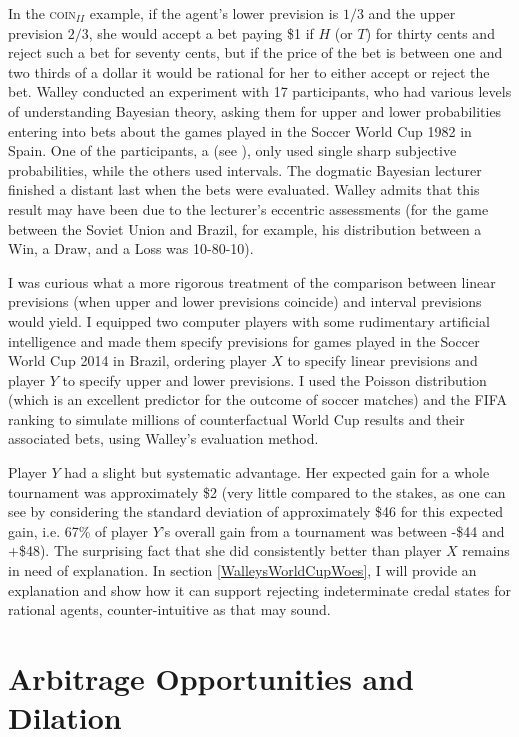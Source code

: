 In the \textsc{coin}$_{II}$ example, if the agent's
lower prevision is $1/3$ and the upper prevision $2/3$,
she would accept a bet paying \$1 if $H$ (or $T$) for
thirty cents and reject such a bet for seventy cents,
but if the price of the bet is between one and two
thirds of a dollar it would be rational for her to
either accept or reject the bet. Walley conducted an
experiment with 17 participants, who had various levels
of understanding Bayesian theory, asking them for upper
and lower probabilities entering into bets about the
games played in the Soccer World Cup 1982 in Spain. One
of the participants, a  (see ), only used
single sharp subjective probabilities, while the others
used intervals. The dogmatic Bayesian lecturer finished
a distant last when the bets were evaluated. Walley
admits that this result may have been due to the
lecturer's eccentric assessments (for the game between
the Soviet Union and Brazil, for example, his
distribution between a Win, a Draw, and a Loss was
10-80-10).

I was curious what a more rigorous treatment of the
comparison between linear previsions (when upper and
lower previsions coincide) and interval previsions
would yield. I equipped two computer players with some
rudimentary artificial intelligence and made them
specify previsions for games played in the Soccer World
Cup 2014 in Brazil, ordering player $X$ to specify
linear previsions and player $Y$ to specify upper and
lower previsions. I used the Poisson distribution
(which is an excellent predictor for the outcome of
soccer matches) and the FIFA ranking to simulate
millions of counterfactual World Cup results and their
associated bets, using Walley's evaluation method.

Player $Y$ had a slight but systematic advantage. Her
expected gain for a whole tournament was approximately
\$2 (very little compared to the stakes, as one can see
by considering the standard deviation of approximately
\$46 for this expected gain, i.e. 67\% of player $Y$'s
overall gain from a tournament was between -\$44 and
+\$48). The surprising fact that she did consistently
better than player $X$ remains in need of explanation.
In section \ref{WalleysWorldCupWoes}, I will provide an
explanation and show how it can support rejecting
indeterminate credal states for rational agents,
counter-intuitive as that may sound.

\section{Arbitrage Opportunities and Dilation}
\label{ArbitrageOpportunitiesAndDilation}

